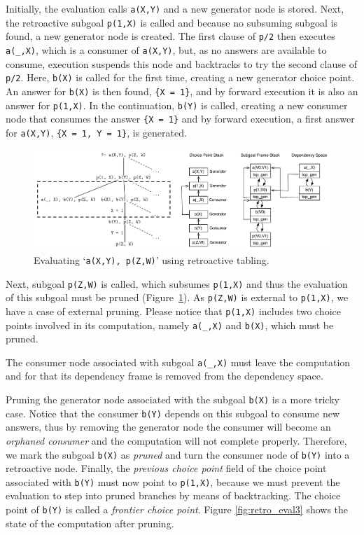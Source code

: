 Initially, the evaluation calls \texttt{a(X,Y)} and a new generator node is stored. Next, the retroactive subgoal
\texttt{p(1,X)} is called and because no subsuming subgoal is found, a new generator node is created.
The first clause of \texttt{p/2} then executes \texttt{a(\_,X)}, which is a consumer of \texttt{a(X,Y)}, but, as
no answers are available to consume, execution suspends this node and backtracks to try the second clause
of \texttt{p/2}. Here, \texttt{b(X)} is called for the first time, creating a new generator choice point.
An answer for \texttt{b(X)} is then found, \texttt{\{X~=~1\}}, and by forward execution it is also an answer
for \texttt{p(1,X)}. In the continuation, \texttt{b(Y)} is called, creating a new consumer node that consumes the answer
\texttt{\{X~=~1\}} and by forward execution, a first answer for \texttt{a(X,Y)}, \texttt{\{X~=~1,~Y~=~1\}},
is generated.

\begin{figure}[ht]
  \centering
    \includegraphics[scale=0.5]{retro_example2.pdf}
  \caption{Evaluating `\texttt{a(X,Y),~p(Z,W)}' using retroactive tabling.}
  \label{fig:retro_eval2}
\end{figure}

Next, subgoal \texttt{p(Z,W)} is called, which subsumes \texttt{p(1,X)} and thus the evaluation of this subgoal
must be pruned (Figure~\ref{fig:retro_eval2}). As \texttt{p(Z,W)} is external to \texttt{p(1,X)}, we have
a case of external pruning. Please notice that \texttt{p(1,X)} includes two choice
points involved in its computation, namely \texttt{a(\_,X)} and \texttt{b(X)}, which must be pruned.

The consumer node associated with subgoal \texttt{a(\_,X)} must leave the computation and for that
its dependency frame is removed from the dependency space.

Pruning the generator node associated with the subgoal \texttt{b(X)} is a more tricky case. Notice that
the consumer \texttt{b(Y)} depends on this subgoal to consume new answers, thus by removing the generator node
the consumer will become an \textit{orphaned consumer} and the computation will not complete properly.
Therefore, we mark the subgoal \texttt{b(X)} as \textit{pruned} and turn the consumer node of \texttt{b(Y)}
into a retroactive node. Finally, the \textit{previous choice point} field of the choice point associated
with \texttt{b(Y)} must now point to \texttt{p(1,X)}, because we must prevent the evaluation to step into
pruned branches by means of backtracking. The choice point of \texttt{b(Y)} is called a
\textit{frontier choice point}. Figure \ref{fig:retro_eval3} shows the state of the computation after pruning.

